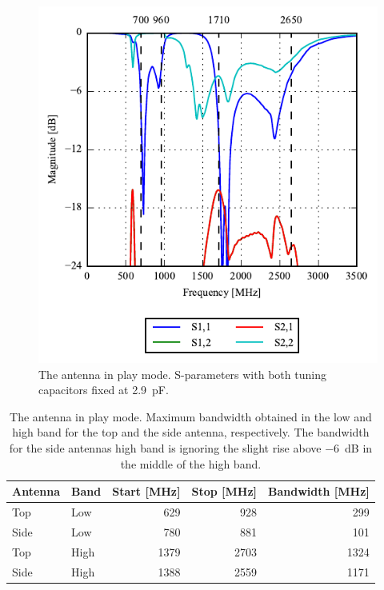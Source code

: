 \begin{figure}[htbp]
    \centering
    \includegraphics{img/tech_sol/nonresonant/simulation/play_mode/s_params_cMax.pdf}
    \caption{The antenna in play mode. S-parameters with both tuning capacitors fixed at \SI{2.9}{pF}.}
    \label{fig:ant3_sparam_play}
\end{figure}

\begin{table}[htbp]
    \centering
    \begin{tabular}{|l|l|r|r|r|}
        \hline
        Antenna & Band & Start [MHz] & Stop [MHz] & Bandwidth [MHz] \\
        \hline
        Top     & Low  & 629         & 928        & 299  \\
        Side    & Low  & 780         & 881        & 101  \\
        \hline
        Top     & High & 1379        & 2703       & 1324 \\
        Side    & High & 1388        & 2559       & 1171 \\
        \hline
    \end{tabular}
    \caption{The antenna in play mode. Maximum bandwidth obtained in the low and high band for the top and the side antenna, respectively. The bandwidth for the side antennas high band is ignoring the slight rise above \SI{-6}{dB} in the middle of the high band.}
    \label{tab:bw_sol3play}
\end{table}


